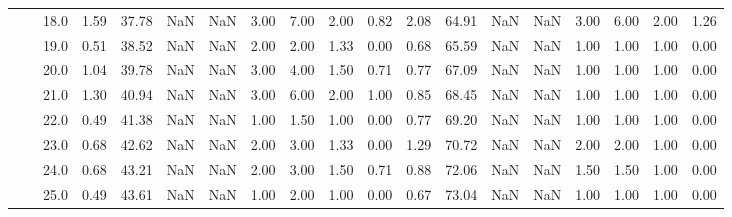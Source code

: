\begin{tabular}{lllrrrrrrrrrrrrrrrr}
          &     & 18.0 &      1.59 &      37.78 &               NaN &                NaN &  3.00 &   7.00 &             2.00 &                         0.82 &      2.08 &      64.91 &               NaN &                NaN &  3.00 &   6.00 &             2.00 &                         1.26 \\
          &     & 19.0 &      0.51 &      38.52 &               NaN &                NaN &  2.00 &   2.00 &             1.33 &                         0.00 &      0.68 &      65.59 &               NaN &                NaN &  1.00 &   1.00 &             1.00 &                         0.00 \\
          &     & 20.0 &      1.04 &      39.78 &               NaN &                NaN &  3.00 &   4.00 &             1.50 &                         0.71 &      0.77 &      67.09 &               NaN &                NaN &  1.00 &   1.00 &             1.00 &                         0.00 \\
          &     & 21.0 &      1.30 &      40.94 &               NaN &                NaN &  3.00 &   6.00 &             2.00 &                         1.00 &      0.85 &      68.45 &               NaN &                NaN &  1.00 &   1.00 &             1.00 &                         0.00 \\
          &     & 22.0 &      0.49 &      41.38 &               NaN &                NaN &  1.00 &   1.50 &             1.00 &                         0.00 &      0.77 &      69.20 &               NaN &                NaN &  1.00 &   1.00 &             1.00 &                         0.00 \\
          &     & 23.0 &      0.68 &      42.62 &               NaN &                NaN &  2.00 &   3.00 &             1.33 &                         0.00 &      1.29 &      70.72 &               NaN &                NaN &  2.00 &   2.00 &             1.00 &                         0.00 \\
          &     & 24.0 &      0.68 &      43.21 &               NaN &                NaN &  2.00 &   3.00 &             1.50 &                         0.71 &      0.88 &      72.06 &               NaN &                NaN &  1.50 &   1.50 &             1.00 &                         0.00 \\
          &     & 25.0 &      0.49 &      43.61 &               NaN &                NaN &  1.00 &   2.00 &             1.00 &                         0.00 &      0.67 &      73.04 &               NaN &                NaN &  1.00 &   1.00 &             1.00 &                         0.00 \\

\end{tabular}
